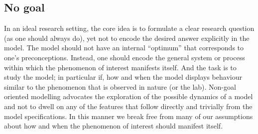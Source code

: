 \subsection{No goal}

In an ideal research setting, the core idea is to formulate a clear research question (as one should always do), yet not to encode the desired answer explicitly in the model. The model should not have an internal “optimum” that corresponds to one’s preconceptions. Instead, one should encode the general system or process within which the phenomenon of interest manifests itself. And the task is to study the model; in particular if, how and when the model displays behaviour similar to the phenomenon that is observed in nature (or the lab). Non-goal oriented modelling advocates the exploration of the possible dynamics of a model and not to dwell on any of the features that follow directly and trivially from the model specifications. In this manner we break free from many of our assumptions about how and when the phenomenon of interest should manifest itself.
  